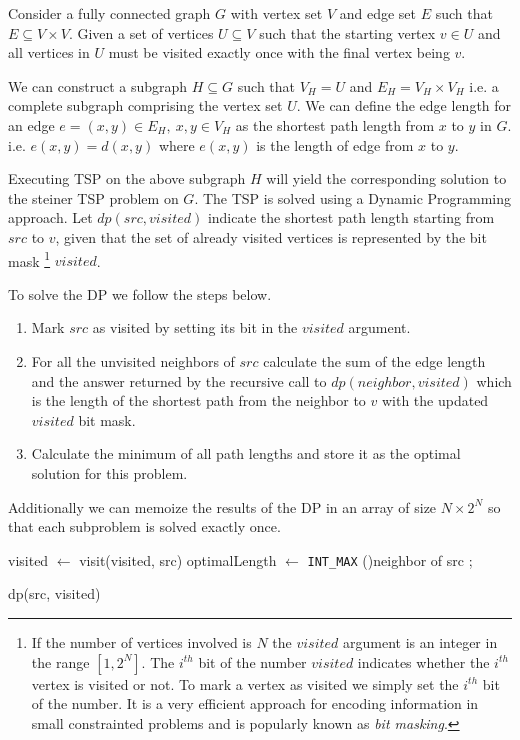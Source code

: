 \documentclass{article}
\begin{document}
Consider a fully connected graph $G$ with vertex set $V$ and edge set $E$ such that $E \subseteq V \times V$. 
Given a set of vertices $U \subseteq V$ such that the starting vertex $v \in U$ and all vertices in $U$ must be visited
exactly once with the final vertex being $v$.

We can construct a subgraph $H \subseteq G$ such that $V_H = U$ and $E_H = V_H \times V_H$ i.e. a complete subgraph
comprising the vertex set $U$. We can define the edge length for an edge $e = (x,y) \in E_H,\ x,y \in V_H $ as the shortest
path length from $x$ to $y$ in $G$. i.e. $e(x,y) = d(x,y)$ where $e(x,y)$ is the length of edge from $x$ to $y$.

Executing TSP on the above subgraph $H$ will yield the corresponding solution to the steiner TSP problem on $G$. The TSP is 
solved using a Dynamic Programming approach. Let $dp(src, visited)$ indicate the shortest path length starting from $src$ to 
$v$, given that the set of already visited vertices is represented by the bit mask 
\footnote{
    If the number of vertices involved is $N$ the $visited$ argument is an integer in the range $[1, 2^N]$. The $i^{th}$ bit of
    the number $visited$ indicates whether the $i^{th}$ vertex is visited or not. To mark a vertex as visited we simply set the $i^{th}$
    bit of the number. It is a very efficient approach for encoding information in small constrainted problems and is popularly known as \textit{bit masking}.
}
$visited$.

To solve the DP we follow the steps below.
\begin{enumerate}
    \item Mark $src$ as visited by setting its bit in the $visited$ argument.
    \item For all the unvisited neighbors of $src$ calculate the sum of the edge length and the answer returned by the recursive call to $dp(neighbor, visited)$ which is the length of the shortest path from the neighbor to $v$ with the updated $visited$ bit mask.
    \item Calculate the minimum of all path lengths and store it as the optimal solution for this problem.
\end{enumerate}
Additionally we can memoize the results of the DP in an array of size $N \times 2^N$ so that each subproblem is solved exactly once.

\begin{algorithm}[H]
    \SetAlgoLined
    visited $\gets$ visit(visited, src)\;
    optimalLength $\gets$ \verb|INT_MAX|\;
    \ForAll(){neighbor of src}{
    }
    ;
    \caption{dp(src, visited)}
\end{algorithm}
\end{document}
